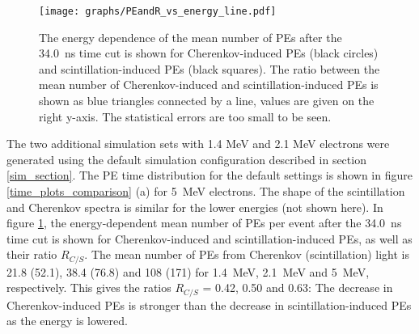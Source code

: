 \documentclass[cits]{JINST}
\begin{document}
\begin{figure}
        \begin{center}
        \texttt{[image: graphs/PEandR\_vs\_energy\_line.pdf]}
        \caption[]{The energy dependence of the mean number of PEs after the 34.0~ns time cut is shown for Cherenkov-induced PEs (black circles) and scintillation-induced PEs (black squares). The ratio between the mean number of Cherenkov-induced and scintillation-induced PEs is shown as blue triangles connected by a line, values are given on the right y-axis. The statistical errors are too small to be seen. \label{Edep_NPE}}
        \end{center}
\end{figure}

The two additional simulation sets with 1.4 MeV and 2.1 MeV electrons were
generated using the default simulation configuration described in section
\ref{sim_section}. The PE time distribution for the default settings is shown
in figure \ref{time_plots_comparison} (a) for 5~MeV electrons. The shape
of the scintillation and Cherenkov spectra is similar for the lower energies (not
shown here). In figure \ref{Edep_NPE}, the energy-dependent mean number of
PEs per event after the 34.0~ns time cut is shown for Cherenkov-induced and
scintillation-induced PEs, as well as their ratio $R_{C/S}$. The mean number
of PEs from Cherenkov (scintillation) light is 21.8 (52.1), 38.4 (76.8)
and 108 (171) for 1.4~MeV, 2.1~MeV and 5~MeV, respectively. This gives the
ratios $R_{C/S}$ = 0.42, 0.50 and 0.63: The decrease in Cherenkov-induced
PEs is stronger than the decrease in scintillation-induced PEs as the energy
is lowered.
\end{document}
